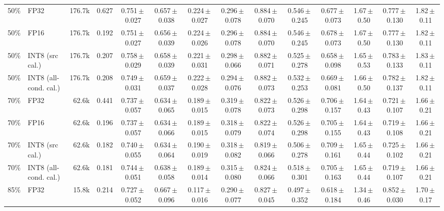 \begin{tabular}{rl r r cccccccccc}
50\% & FP32 & 176.7k & 0.627 & 0.751\,$\pm$\,0.027 & 0.657\,$\pm$\,0.038 & 0.224\,$\pm$\,0.027 & 0.296\,$\pm$\,0.078 & 0.884\,$\pm$\,0.070 & 0.546\,$\pm$\,0.245 & 0.677\,$\pm$\,0.073 & 1.67\,$\pm$\,0.50 & 0.777\,$\pm$\,0.130 & 1.82\,$\pm$\,0.11 \\
50\% & FP16 & 176.7k & 0.192 & 0.751\,$\pm$\,0.027 & 0.656\,$\pm$\,0.039 & 0.224\,$\pm$\,0.026 & 0.296\,$\pm$\,0.078 & 0.884\,$\pm$\,0.070 & 0.546\,$\pm$\,0.245 & 0.678\,$\pm$\,0.073 & 1.67\,$\pm$\,0.50 & 0.777\,$\pm$\,0.130 & 1.82\,$\pm$\,0.11 \\
50\% & INT8 (src cal.) & 176.7k & 0.207 & 0.758\,$\pm$\,0.029 & 0.658\,$\pm$\,0.039 & 0.221\,$\pm$\,0.031 & 0.298\,$\pm$\,0.066 & 0.882\,$\pm$\,0.071 & 0.525\,$\pm$\,0.278 & 0.658\,$\pm$\,0.098 & 1.65\,$\pm$\,0.53 & 0.783\,$\pm$\,0.133 & 1.83\,$\pm$\,0.11 \\
50\% & INT8 (all-cond. cal.) & 176.7k & 0.208 & 0.749\,$\pm$\,0.031 & 0.659\,$\pm$\,0.037 & 0.222\,$\pm$\,0.028 & 0.294\,$\pm$\,0.076 & 0.882\,$\pm$\,0.073 & 0.532\,$\pm$\,0.253 & 0.669\,$\pm$\,0.081 & 1.66\,$\pm$\,0.50 & 0.782\,$\pm$\,0.137 & 1.82\,$\pm$\,0.11 \\
70\% & FP32 & 62.6k & 0.441 & 0.737\,$\pm$\,0.057 & 0.634\,$\pm$\,0.065 & 0.189\,$\pm$\,0.015 & 0.319\,$\pm$\,0.078 & 0.822\,$\pm$\,0.073 & 0.526\,$\pm$\,0.298 & 0.706\,$\pm$\,0.157 & 1.64\,$\pm$\,0.43 & 0.721\,$\pm$\,0.107 & 1.66\,$\pm$\,0.21 \\
70\% & FP16 & 62.6k & 0.196 & 0.737\,$\pm$\,0.057 & 0.634\,$\pm$\,0.066 & 0.189\,$\pm$\,0.015 & 0.318\,$\pm$\,0.079 & 0.822\,$\pm$\,0.074 & 0.526\,$\pm$\,0.298 & 0.705\,$\pm$\,0.155 & 1.64\,$\pm$\,0.43 & 0.719\,$\pm$\,0.108 & 1.66\,$\pm$\,0.21 \\
70\% & INT8 (src cal.) & 62.6k & 0.182 & 0.740\,$\pm$\,0.055 & 0.634\,$\pm$\,0.064 & 0.190\,$\pm$\,0.019 & 0.318\,$\pm$\,0.082 & 0.819\,$\pm$\,0.066 & 0.506\,$\pm$\,0.278 & 0.709\,$\pm$\,0.161 & 1.65\,$\pm$\,0.44 & 0.725\,$\pm$\,0.102 & 1.66\,$\pm$\,0.21 \\
70\% & INT8 (all-cond. cal.) & 62.6k & 0.181 & 0.744\,$\pm$\,0.051 & 0.638\,$\pm$\,0.058 & 0.189\,$\pm$\,0.014 & 0.315\,$\pm$\,0.080 & 0.824\,$\pm$\,0.066 & 0.518\,$\pm$\,0.301 & 0.705\,$\pm$\,0.163 & 1.65\,$\pm$\,0.44 & 0.719\,$\pm$\,0.107 & 1.66\,$\pm$\,0.21 \\
85\% & FP32 & 15.8k & 0.214 & 0.727\,$\pm$\,0.052 & 0.667\,$\pm$\,0.096 & 0.117\,$\pm$\,0.016 & 0.290\,$\pm$\,0.077 & 0.827\,$\pm$\,0.045 & 0.497\,$\pm$\,0.352 & 0.618\,$\pm$\,0.184 & 1.34\,$\pm$\,0.46 & 0.852\,$\pm$\,0.030 & 1.70\,$\pm$\,0.17 \\

\end{tabular}
